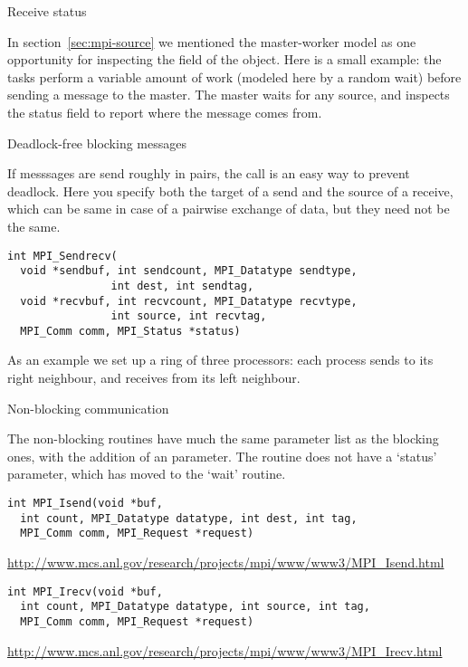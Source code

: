  {Receive status}

In section~\ref{sec:mpi-source} we mentioned the master-worker model
as one opportunity for inspecting the  field
of the  object. Here is a small example: 
the tasks perform a variable amount of work (modeled here by a random wait)
before sending a message to the master. The master waits for any source,
and inspects the status field to report where the message comes from.


 {Deadlock-free blocking messages}

If messsages are send roughly in pairs, the 
 call is an easy way to prevent deadlock.
Here you specify both the target of a send and the source of a receive,
which can be same in case of a pairwise exchange of data,
but they need not be the same.
\begin{verbatim}
int MPI_Sendrecv(
  void *sendbuf, int sendcount, MPI_Datatype sendtype, 
                int dest, int sendtag,
  void *recvbuf, int recvcount, MPI_Datatype recvtype, 
                int source, int recvtag,
  MPI_Comm comm, MPI_Status *status)
\end{verbatim}

As an example we set up a ring of three processors: each process sends
to its right neighbour, and receives from its left neighbour.

 {Non-blocking communication}

The non-blocking routines have much the same parameter list as the 
blocking ones, with the addition of an  parameter.
The  routine does not have a `status' parameter,
which has moved to the `wait' routine.
\begin{verbatim}
int MPI_Isend(void *buf,
  int count, MPI_Datatype datatype, int dest, int tag,
  MPI_Comm comm, MPI_Request *request)
\end{verbatim}
\url{http://www.mcs.anl.gov/research/projects/mpi/www/www3/MPI_Isend.html}
\begin{verbatim}
int MPI_Irecv(void *buf,
  int count, MPI_Datatype datatype, int source, int tag,
  MPI_Comm comm, MPI_Request *request)
\end{verbatim}
\url{http://www.mcs.anl.gov/research/projects/mpi/www/www3/MPI_Irecv.html}

